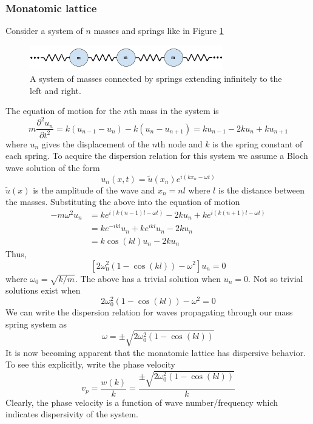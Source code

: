 \documentclass{article}
\begin{document}
\subsubsection{Monatomic lattice} \label{monatomic}
Consider a system of $n$ masses and springs like in Figure \ref{fig:ms} 
\begin{figure}[!htbp]
	\centering
	\includegraphics[width=0.75\textwidth]{mass-spring.pdf}
	\caption{A system of masses connected by springs extending infinitely to 
	the left and right.}
	\label{fig:ms}
\end{figure}
The equation of motion for the $n$th mass in the system is
\begin{equation} \label{eqnms}
m\frac{\partial^2 u_n}{\partial t^2} = k(u_{n-1} - u_n) - k(u_n - u_{n+1}) = 
ku_{n-1} - 2ku_n + ku_{n+1} 
\end{equation}
where $u_n$ gives the displacement of the $n$th node and $k$ is the spring 
constant of each spring. To acquire the dispersion relation for this system we 
assume a Bloch wave solution of the form
\begin{equation} \label{bloch}
u_n(x,t) = \tilde{u}(x_n)e^{i(kx_n - \omega t)}
\end{equation}
$\tilde{u}(x)$ is the amplitude of the wave and $x_n = nl$ where $l$ is the 
distance between the masses. Substituting the above into the equation of motion
\begin{align*}
-m \omega^2 u_n   &= ke^{i(k(n-1)l - \omega t)} - 2ku_n + ke^{i(k(n+1)l - 
\omega t)} \\
&= ke^{-ikl}u_n + ke^{ikl}u_n - 2ku_n \\
&= k\cos(kl)u_n - 2ku_n
\end{align*}
Thus,
\begin{equation}
\left[2\omega_0^2(1 - \cos(kl)) - \omega^2\right]u_n = 0
\end{equation}
where $\omega_0 = \sqrt{k/m}$. The above has a trivial solution when $u_n = 0$. 
Not so trivial solutions exist when
\begin{equation}
2\omega_0^2(1 - \cos(kl)) - \omega^2= 0
\end{equation}
We can write the dispersion relation for waves propagating through our mass 
spring system as
\begin{equation} \label{monatomicdisp}
\omega = \pm \sqrt{2\omega_0^2(1 - \cos(kl))}
\end{equation}
It is now becoming apparent that the monatomic lattice has dispersive behavior. 
To see this explicitly, write the phase velocity
\begin{equation}
v_p = \frac{w(k)}{k} = \frac{\pm\sqrt{2\omega_0^2(1 - \cos(kl))}}{k}
\end{equation}
Clearly, the phase velocity is a function of wave number/frequency which 
indicates dispersivity of the system.
\end{document}
